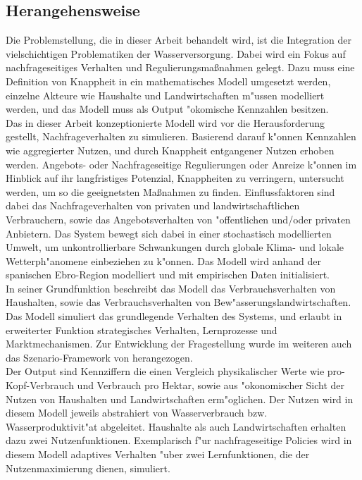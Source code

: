 \documentclass[11pt,a4paper]{article}
\begin{document}
\subsection{Herangehensweise}
Die Problemstellung, die in dieser Arbeit behandelt wird, ist die Integration der vielschichtigen Problematiken der Wasserversorgung. Dabei wird ein Fokus auf nachfrageseitiges Verhalten und Regulierungsmaßnahmen gelegt. Dazu muss eine Definition von Knappheit in ein mathematisches Modell umgesetzt werden, einzelne Akteure wie Haushalte und Landwirtschaften m"ussen modelliert werden, und das Modell muss als Output "okomische Kennzahlen besitzen.\\
Das in dieser Arbeit konzeptionierte Modell wird vor die Herausforderung gestellt, Nachfrageverhalten zu simulieren. Basierend darauf k"onnen Kennzahlen wie aggregierter Nutzen, und durch Knappheit entgangener Nutzen erhoben werden. Angebots- oder Nachfrageseitige Regulierungen oder Anreize k"onnen im Hinblick auf ihr langfristiges Potenzial, Knappheiten zu verringern, untersucht werden, um so die geeignetsten Maßnahmen zu finden. Einflussfaktoren sind dabei das Nachfrageverhalten von privaten und landwirtschaftlichen Verbrauchern, sowie das Angebotsverhalten von "offentlichen und/oder privaten Anbietern. Das System bewegt sich dabei in einer stoch\-astisch modellierten Umwelt, um unkontrollierbare Schwankungen durch globale Klima- und lokale Wetterph"anomene einbeziehen zu k"onnen. Das Modell wird anhand der spanischen Ebro-Region modelliert und mit empirischen Daten initialisiert. \\

In seiner Grundfunktion beschreibt das Modell das Verbrauchsverhalten von Haushalten, sowie das Verbrauchsverhalten von Bew"asserungslandwirtschaften. Das Modell simuliert das grundlegende Verhalten des Systems, und erlaubt in erweiterter Funktion strategisches Verhalten, Lernprozesse und Marktmechanismen. Zur Entwicklung der Fragestellung wurde im weiteren auch das Szenario-Framework von \cite{Leenhardt2012} herangezogen.\\
Der Output sind Kennziffern die einen Vergleich physikalischer Werte wie pro-Kopf-Verbrauch und Verbrauch pro Hektar, sowie aus "okonomischer Sicht der Nutzen von Haushalten und Landwirtschaften erm"oglichen. Der Nutzen wird in diesem Modell jeweils abstrahiert von Wasserverbrauch bzw. Wasserproduktivit"at abgeleitet. Haushalte als auch Landwirtschaften erhalten dazu zwei Nutzenfunktionen. Exemplarisch f"ur nachfrageseitige Policies wird in diesem Modell adaptives Verhalten "uber zwei Lernfunktionen, die der Nutzenmaximierung dienen, simuliert.\\
\end{document}
